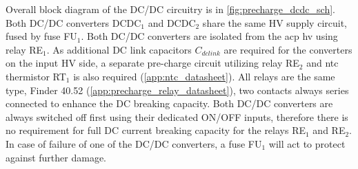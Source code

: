 Overall block diagram of the DC/DC circuitry is in \ref{fig:precharge_dcdc_sch}. Both DC/DC converters DCDC$_1$ and DCDC$_2$ share the same HV supply circuit, fused by fuse FU$_1$. Both DC/DC converters are isolated from the \gls{acp} \gls{hv} using relay RE$_1$. As additional DC link capacitors $C_{dclink}$ are required for the converters on the input HV side, a separate pre-charge circuit utilizing relay RE$_2$ and \gls{ntc} thermistor RT$_1$ is also required (\ref{app:ntc_datasheet}). 
All relays are the same type, Finder 40.52 (\ref{app:precharge_relay_datasheet}), two contacts always series connected to enhance the DC breaking capacity. Both DC/DC converters are always switched off first using their dedicated ON/OFF inputs, therefore there is no requirement for full DC current breaking capacity for the relays RE$_1$ and RE$_2$. In case of failure of one of the DC/DC converters, a fuse FU$_1$ will act to protect against further damage.

